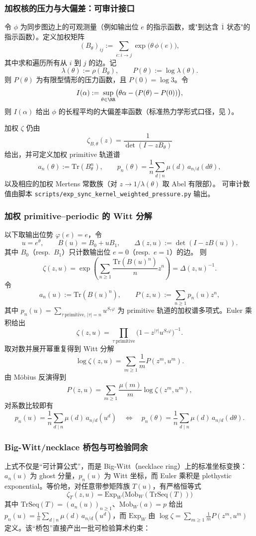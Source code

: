 \subsubsection{加权核的压力与大偏差：可审计接口}
令 $\phi$ 为同步图边上的可观测量（例如输出位 $e$ 的指示函数，或"到达含 $\overline{1}$ 状态"的指示函数）。定义加权矩阵
\[
(B_\theta)_{ij}:=\sum_{e:i\to j}\exp\bigl(\theta\,\phi(e)\bigr),
\]
其中求和遍历所有从 $i$ 到 $j$ 的边。记
\[
\lambda(\theta):=\rho(B_\theta),\qquad P(\theta):=\log\lambda(\theta).
\]
则 $P(\theta)$ 为有限型情形的压力函数，且 $P(0)=\log 3$。令
\[
I(\alpha):=\sup_{\theta\in\RR}\bigl(\theta\alpha-(P(\theta)-P(0))\bigr),
\]
则 $I(\alpha)$ 给出 $\phi$ 的长程平均的大偏差率函数（标准热力学形式口径，见 \cite{Ruelle1978Thermodynamic,ParryPollicott1990Zeta}）。

加权 $\zeta$ 仍由
\[
\zeta_{B,\theta}(z)=\frac{1}{\det(I-zB_\theta)}
\]
给出，并可定义加权 primitive 轨道谱
\[
a_n(\theta):=\mathrm{Tr}(B_\theta^n),\qquad
p_n(\theta)=\frac{1}{n}\sum_{d\mid n}\mu(d)\,a_{n/d}(d\theta),
\]
以及相应的加权 Mertens 常数族（对 $z\to 1/\lambda(\theta)$ 取 Abel 有限部）。
可审计数值由脚本 \texttt{scripts/exp\_sync\_kernel\_weighted\_pressure.py} 输出。

\subsubsection{加权 primitive--periodic 的 Witt 分解}\label{app:witt-weighted}
以下取输出位势 $\varphi(e)=e$，令
\[
u=e^\theta,\qquad B(u)=B_0+uB_1,\qquad \Delta(z,u):=\det(I-zB(u)).
\]
其中 $B_0$（resp.\ $B_1$）只计数输出位 $e=0$（resp.\ $e=1$）的边。
则
\[
\zeta(z,u)=\exp\!\left(\sum_{n\ge 1}\frac{\mathrm{Tr}(B(u)^n)}{n}z^n\right)=\Delta(z,u)^{-1}.
\]
令
\[
a_n(u):=\mathrm{Tr}(B(u)^n),\qquad
P(z,u):=\sum_{n\ge 1}p_n(u)z^n,
\]
其中
\(
p_n(u)=\sum_{\tau\ \mathrm{primitive},\,|\tau|=n}u^{S_\tau\varphi}
\)
为 primitive 轨道的加权谱多项式。Euler 乘积给出
\[
\zeta(z,u)=\prod_{\tau\ \mathrm{primitive}}\bigl(1-z^{|\tau|}u^{S_\tau\varphi}\bigr)^{-1}.
\]
取对数并展开幂重复得到 Witt 分解
\[
\log\zeta(z,u)=\sum_{m\ge 1}\frac{1}{m}P(z^m,u^m).
\]
由 Möbius 反演得到
\[
P(z,u)=\sum_{m\ge 1}\frac{\mu(m)}{m}\log\zeta(z^m,u^m),
\]
对系数比较即有
\[
p_n(u)=\frac{1}{n}\sum_{d\mid n}\mu(d)\,a_{n/d}(u^d)
\quad\Longleftrightarrow\quad
p_n(\theta)=\frac{1}{n}\sum_{d\mid n}\mu(d)\,a_{n/d}(d\theta).
\]

\subsubsection{Big-Witt/necklace 桥包与可检验同余}\label{app:witt-bridge-package}
上式不仅是“可计算公式”，而是 Big-Witt（necklace ring）上的标准坐标变换：$a_n(u)$ 为 ghost 分量，$p_n(u)$ 为 Witt 坐标，而 Euler 乘积是 plethystic exponential。等价地，对任意带参矩阵族 $T(u)$，有严格恒等式
\[
\boxed{\ \zeta_T(z,u)=\mathrm{Exp}_W\bigl(\mathrm{Mob}_W(\mathrm{TrSeq}(T))\bigr)\ }
\]
其中 $\mathrm{TrSeq}(T)=(a_n(u))_{n\ge 1}$、$\mathrm{Mob}_W(a)=p$ 给出 $p_n(u)=\frac1n\sum_{d\mid n}\mu(d)\,a_{n/d}(u^d)$，而 $\mathrm{Exp}_W$ 由
\(
\log\zeta=\sum_{m\ge 1}\frac{1}{m}P(z^m,u^m)
\)
定义。该“桥包”直接产出一批可检验算术约束：

